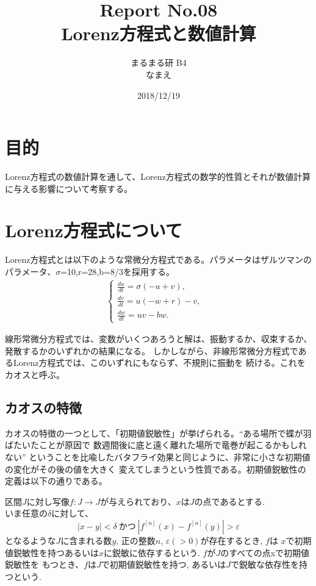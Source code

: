 \documentclass[12pt]{ltjsarticle}
\begin{document}
\begin{titlepage}
\title{Report No.08　\\ Lorenz方程式と数値計算}
\author{まるまる研 B4 \\ なまえ}
\date{2018/12/19}
\maketitle

\end{titlepage}

\section{目的}
Lorenz方程式の数値計算を通して、Lorenz方程式の数学的性質とそれが数値計算に与える影響について考察する。

\section{Lorenz方程式について}
Lorenz方程式とは以下のような常微分方程式である。パラメータはザルツマンのパラメータ、$\sigma$=10,r=28,b=8/3を採用する。
\begin{eqnarray}
    \begin{cases}
        \frac{du}{dt} = \sigma(-u+v), & \\
        \frac{dv}{dt} = u(-w+r)-v, & \\
        \frac{dw}{dt} = uv-bw. &
    \end{cases}
    \label{newton}
\end{eqnarray}

線形常微分方程式では、変数がいくつあろうと解は、振動するか、収束するか、発散するかのいずれかの結果になる。
しかしながら、非線形常微分方程式であるLorenz方程式では、このいずれにもならず、不規則に振動を
続ける。これをカオスと呼ぶ。

\subsection{カオスの特徴}
カオスの特徴の一つとして、「初期値鋭敏性」が挙げられる。“ある場所で蝶が羽ばたいたことが原因で
数週間後に底と遠く離れた場所で竜巻が起こるかもしれない”
ということを比喩したバタフライ効果と同じように、非常に小さな初期値の変化がその後の値を大きく
変えてしまうという性質である。初期値鋭敏性の定義は以下の通りである。\\
\begin{tcolorbox}
    区間$J$に対し写像$f:J \rightarrow J$が与えられており、$x$は$J$の点であるとする.\\
    いま任意の$\delta$に対して、
    \begin{equation*}
        |x-y| < \delta \ かつ \ |f^{[n]}(x) - f^{[n]}(y)| > \varepsilon
    \end{equation*}
    となるような$J$に含まれる数$y$, 正の整数$n$, $\varepsilon(>0)$が存在するとき, $f$は
    $x$で初期値鋭敏性を持つあるいは$x$に鋭敏に依存するという. $f$が$J$のすべての点xで初期値鋭敏性を
    もつとき、$f$は$J$で初期値鋭敏性を持つ, あるいは$J$で鋭敏な依存性を持つという.
\end{tcolorbox}
\end{document}
